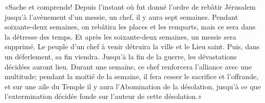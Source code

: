 «Sache et comprends!
	Depuis l’instant où fut donné l’ordre de rebâtir Jérusalem
	jusqu’à l’avènement d’un messie, un chef,
	il y aura sept semaines.
Pendant soixante-deux semaines, on rebâtira les places et les remparts,
	mais ce sera dans la détresse des temps.
Et après les soixante-deux semaines, un messie sera supprimé.
Le peuple d’un chef à venir détruira la ville et le Lieu saint.
	Puis, dans un déferlement, sa fin viendra.
Jusqu’à la fin de la guerre, les dévastations décidées auront lieu.
Durant une semaine, ce chef renforcera l’alliance avec une multitude;
	pendant la moitié de la semaine, il fera cesser le sacrifice et l’offrande,
	et sur une aile du Temple il y aura l’Abomination de la désolation,
	jusqu’à ce que l’extermination décidée fonde sur l’auteur de cette désolation.»
